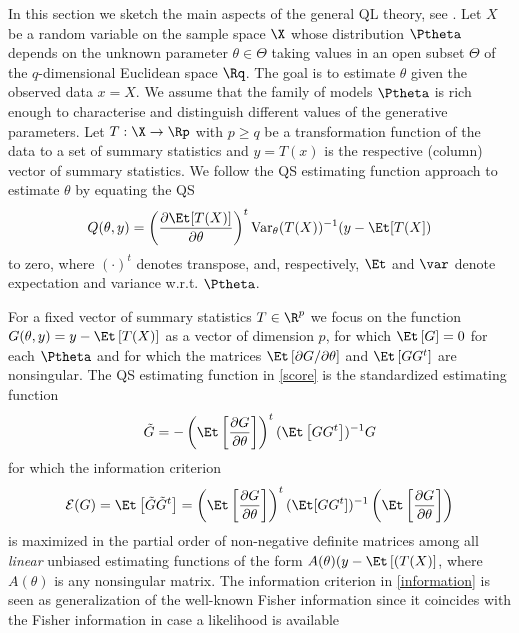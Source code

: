In this section we sketch the main aspects of the general QL theory, see
\cite{ref:Heyde1997}. Let $X$ be a random variable on the sample space $\X$ whose
distribution $\Ptheta$ depends on the unknown parameter $\theta\in\Theta$ taking values
in an open subset $\Theta$ of the $q$-dimensional Euclidean space $\Rq$.
The goal is to estimate $\theta$ given the observed data $x=X$. We
assume that the family of models $\Ptheta$ is rich enough to characterise and distinguish
different values of the generative parameters. Let $T : \X\rightarrow \Rp$ with $p\geq q$ be a
transformation function of the data to a set of summary statistics and $y = T(x)$ is the respective
(column) vector of summary statistics. We follow the QS estimating function
approach to estimate $\theta$ by equating the QS
\begin{equation}\label{score}
  Q(\theta,y)=\left( \frac{\partial\Et[T(X)]}{\partial\theta} \right)^t \mathrm{Var}_{\theta}(T(X))^{-1}(y-\Et[T(X])
\end{equation}
to zero, where $(\cdot)^t$ denotes transpose, and, respectively, $\Et$ and
$\var$ denote expectation and variance w.r.t. $\Ptheta$.\par
%
For a fixed vector of summary statistics $T\in\R^p$ we focus on the function
$G(\theta,y)=y-\Et\left[T(X)\right]$ as a vector of dimension $p$, for which
$\Et\left[G\right]=0$ for each $\Ptheta$ and for which
the matrices $\Et\left[\partial G/\partial\theta\right]$
and $\Et\left[GG^t\right]$ are nonsingular.
The QS estimating function in \eqref{score} is the standardized estimating
function
\begin{equation}
 \tilde{G} = -\left(\Et\left[\frac{\partial G}{\partial \theta}\right]\right)^t (\Et\left[GG^t\right])^{-1}G
\end{equation}
for which the information criterion
\begin{equation}\label{information}
\mathcal{E}(G) = \Et\left[\tilde{G}\tilde{G}^t\right] = \left( \Et\left[\frac{\partial G}{\partial \theta}\right]\right)^t (\Et[GG^t])^{-1}
\left(\Et\left[\frac{\partial G}{\partial \theta}\right]\right)
\end{equation}
is maximized in the partial order of non-negative definite matrices among all
\emph{linear} unbiased estimating functions
of the form $A(\theta)(y-\Et\left[(T(X)\right]$, where $A(\theta)$ is any
nonsingular matrix. The information criterion in \eqref{information} is seen as generalization of the
well-known Fisher information since it coincides with the Fisher information in case a likelihood is available
